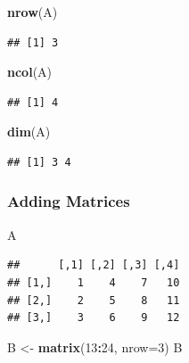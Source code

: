 \documentclass[]{book}
\newenvironment{Shaded}{\begin{snugshade}}{\end{snugshade}}
\newcommand{\DataTypeTok}[1]{\textcolor[rgb]{0.13,0.29,0.53}{#1}}
\newcommand{\DecValTok}[1]{\textcolor[rgb]{0.00,0.00,0.81}{#1}}
\newcommand{\KeywordTok}[1]{\textcolor[rgb]{0.13,0.29,0.53}{\textbf{#1}}}
\newcommand{\NormalTok}[1]{#1}
\newcommand{\OperatorTok}[1]{\textcolor[rgb]{0.81,0.36,0.00}{\textbf{#1}}}
\newcommand{\StringTok}[1]{\textcolor[rgb]{0.31,0.60,0.02}{#1}}
\theoremstyle{definition}
\theoremstyle{definition}
\theoremstyle{definition}
\theoremstyle{remark}
\begin{document}
\begin{Shaded}
\begin{Highlighting}[]
\KeywordTok{nrow}\NormalTok{(A)}
\end{Highlighting}
\end{Shaded}

\begin{verbatim}
## [1] 3
\end{verbatim}

\begin{Shaded}
\begin{Highlighting}[]
\KeywordTok{ncol}\NormalTok{(A)}
\end{Highlighting}
\end{Shaded}

\begin{verbatim}
## [1] 4
\end{verbatim}

\begin{Shaded}
\begin{Highlighting}[]
\KeywordTok{dim}\NormalTok{(A)}
\end{Highlighting}
\end{Shaded}

\begin{verbatim}
## [1] 3 4
\end{verbatim}

\hypertarget{adding-matrices}{%
\subsubsection{Adding Matrices}\label{adding-matrices}}

\begin{Shaded}
\begin{Highlighting}[]
\NormalTok{A}
\end{Highlighting}
\end{Shaded}

\begin{verbatim}
##      [,1] [,2] [,3] [,4]
## [1,]    1    4    7   10
## [2,]    2    5    8   11
## [3,]    3    6    9   12
\end{verbatim}

\begin{Shaded}
\begin{Highlighting}[]
\NormalTok{B <-}\StringTok{  }\KeywordTok{matrix}\NormalTok{(}\DecValTok{13}\OperatorTok{:}\DecValTok{24}\NormalTok{, }\DataTypeTok{nrow=}\DecValTok{3}\NormalTok{)}
\NormalTok{B}
\end{Highlighting}
\end{Shaded}
\end{document}
